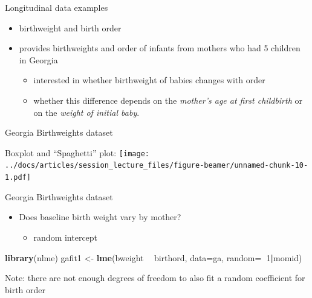\documentclass[
  ignorenonframetext,
]{beamer}
\newenvironment{Shaded}{\begin{snugshade}}{\end{snugshade}}
\newcommand{\DataTypeTok}[1]{\textcolor[rgb]{0.13,0.29,0.53}{#1}}
\newcommand{\DecValTok}[1]{\textcolor[rgb]{0.00,0.00,0.81}{#1}}
\newcommand{\KeywordTok}[1]{\textcolor[rgb]{0.13,0.29,0.53}{\textbf{#1}}}
\newcommand{\NormalTok}[1]{#1}
\newcommand{\OperatorTok}[1]{\textcolor[rgb]{0.81,0.36,0.00}{\textbf{#1}}}
\newcommand{\StringTok}[1]{\textcolor[rgb]{0.31,0.60,0.02}{#1}}
\providecommand{\tightlist}{%
  \setlength{\itemsep}{0pt}\setlength{\parskip}{0pt}}
\begin{document}
\begin{frame}{Longitudinal data examples}
\protect\hypertarget{longitudinal-data-examples-1}{}

\begin{itemize}
\tightlist
\item
  birthweight and birth order
\item
  provides birthweights and order of infants from mothers who had 5
  children in Georgia

  \begin{itemize}
  \tightlist
  \item
    interested in whether birthweight of babies changes with order
  \item
    whether this difference depends on the \emph{mother's age at first
    childbirth} or on the \emph{weight of initial baby}.
  \end{itemize}
\end{itemize}

\end{frame}

\begin{frame}{Georgia Birthweights dataset}
\protect\hypertarget{georgia-birthweights-dataset}{}

Boxplot and ``Spaghetti'' plot:
\texttt{[image: ../docs/articles/session\_lecture\_files/figure-beamer/unnamed-chunk-10-1.pdf]}

\end{frame}

\begin{frame}[fragile]{Georgia Birthweights dataset}
\protect\hypertarget{georgia-birthweights-dataset-1}{}

\begin{itemize}
\tightlist
\item
  Does baseline birth weight vary by mother?

  \begin{itemize}
  \tightlist
  \item
    random intercept
  \end{itemize}
\end{itemize}

\begin{Shaded}
\begin{Highlighting}[]
\KeywordTok{library}\NormalTok{(nlme)}
\NormalTok{gafit1 <-}\StringTok{ }\KeywordTok{lme}\NormalTok{(bweight }\OperatorTok{~}\StringTok{ }\NormalTok{birthord, }\DataTypeTok{data=}\NormalTok{ga, }\DataTypeTok{random=}\OperatorTok{~}\DecValTok{1}\OperatorTok{|}\NormalTok{momid)}
\end{Highlighting}
\end{Shaded}

Note: there are not enough degrees of freedom to also fit a random
coefficient for birth order

\end{frame}
\end{document}
